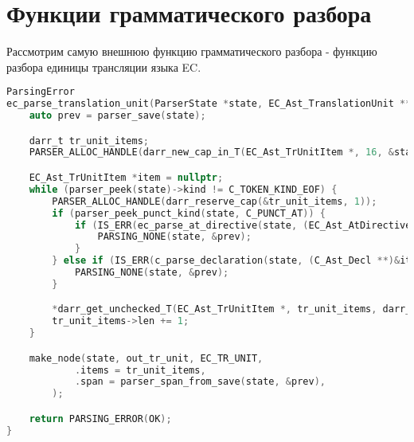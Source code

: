 \section{Функции грамматического разбора}

Рассмотрим самую внешнюю функцию грамматического разбора - функцию разбора единицы трансляции языка EC.
\begin{lstlisting}[language=c, caption={Функция разбора единицы трансляции}, label={parsing:ec-parse-tr-unit}]
ParsingError
ec_parse_translation_unit(ParserState *state, EC_Ast_TranslationUnit **out_tr_unit) {
    auto prev = parser_save(state);

    darr_t tr_unit_items;
    PARSER_ALLOC_HANDLE(darr_new_cap_in_T(EC_Ast_TrUnitItem *, 16, &state->ast_alloc, &tr_unit_items));

    EC_Ast_TrUnitItem *item = nullptr;
    while (parser_peek(state)->kind != C_TOKEN_KIND_EOF) {
        PARSER_ALLOC_HANDLE(darr_reserve_cap(&tr_unit_items, 1));
        if (parser_peek_punct_kind(state, C_PUNCT_AT)) {
            if (IS_ERR(ec_parse_at_directive(state, (EC_Ast_AtDirective **)&item))) {
                PARSING_NONE(state, &prev);
            }
        } else if (IS_ERR(c_parse_declaration(state, (C_Ast_Decl **)&item))) {
            PARSING_NONE(state, &prev);
        }

        *darr_get_unchecked_T(EC_Ast_TrUnitItem *, tr_unit_items, darr_len(tr_unit_items)) = item;
        tr_unit_items->len += 1;
    }

    make_node(state, out_tr_unit, EC_TR_UNIT, 
            .items = tr_unit_items,
            .span = parser_span_from_save(state, &prev),
        );

    return PARSING_ERROR(OK);
}
\end{lstlisting}







